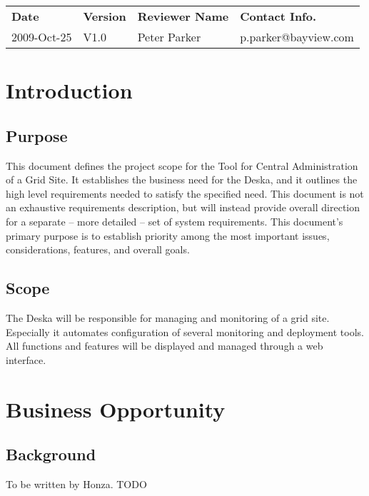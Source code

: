 \documentclass[12pt]{article}
\begin{document}
\begin{table}[!h]
	\begin{tabular}{l l l l}
		\textbf{Date} & \textbf{Version} & \textbf{Reviewer Name} & \textbf{Contact Info.} \\
		2009-Oct-25 & V1.0 & Peter Parker & p.parker@bayview.com \\
	\end{tabular}
	\label{tab:DocumentApproval}
\end{table}


\newpage

\tableofcontents

\newpage

\section{Introduction}

\subsection{Purpose}
This document defines the project scope for the Tool for Central Administration of a Grid Site. It establishes the business need for the Deska, and it outlines the high level requirements needed to satisfy the specified need. This document is not an exhaustive requirements description, but will instead provide overall direction for a separate -- more detailed -- set of system requirements. This document's primary purpose is to establish priority among the most important issues, considerations, features, and overall goals.

\subsection{Scope}
The Deska will be responsible for managing and monitoring of a grid site. Especially it automates configuration of several monitoring and deployment tools. All functions and features will be displayed and managed through a web interface.


\section{Business Opportunity}

\subsection{Background}
To be written by Honza. TODO
 
\end{document}
